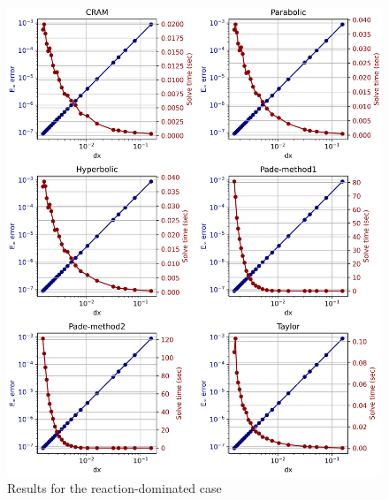 \clearpage

\begin{figure}[p]
    \centering
    \includegraphics[width=5.0in]{images/chapter-5/progressionProblems/problem2/problem2b.png}
    \caption{Results for the reaction-dominated case}
    \label{fig:problem2_reaction_dom}
\end{figure}

\clearpage

